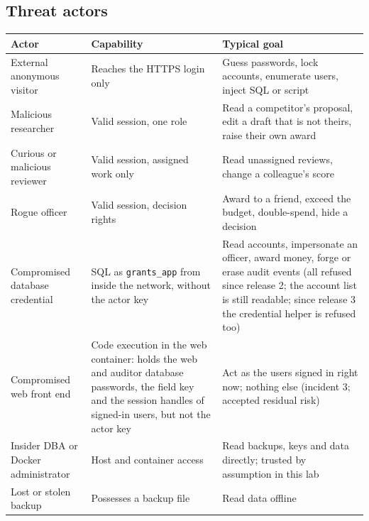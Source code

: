 \documentclass[10pt,a4paper]{article}
\newcommand{\code}[1]{\nolinkurl{#1}}
\newcommand{\tcap}[1]{\captionof{table}{#1}\nopagebreak[4]\vspace{-3pt}}
\begin{document}
\subsection{Threat actors}
\tcap{Threat actors}
\begin{center}\small
\begin{tabularx}{\linewidth}{@{}L{3.1cm}L{4.3cm}Y@{}}
\toprule\textbf{Actor} & \textbf{Capability} & \textbf{Typical goal}\\\midrule
External anonymous visitor & Reaches the HTTPS login only & Guess passwords, lock accounts, enumerate users, inject SQL or script\\
Malicious researcher & Valid session, one role & Read a competitor's proposal, edit a draft that is not theirs, raise their own award\\
Curious or malicious reviewer & Valid session, assigned work only & Read unassigned reviews, change a colleague's score\\
Rogue officer & Valid session, decision rights & Award to a friend, exceed the budget, double-spend, hide a decision\\
Compromised database credential & SQL as \code{grants_app} from inside the network, without the actor key & Read accounts, impersonate an officer, award money, forge or erase audit events (all refused since release 2; the account list is still readable; since release 3 the credential helper is refused too)\\
Compromised web front end & Code execution in the web container: holds the web and auditor database passwords, the field key and the session handles of signed-in users, but not the actor key & Act as the users signed in right now; nothing else (incident 3; accepted residual risk)\\
Insider DBA or Docker administrator & Host and container access & Read backups, keys and data directly; trusted by assumption in this lab\\
Lost or stolen backup & Possesses a backup file & Read data offline\\
\bottomrule\end{tabularx}\end{center}
\end{document}
